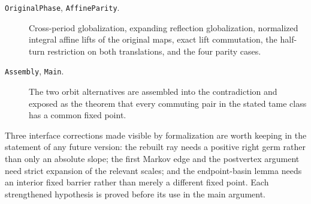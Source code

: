 \documentclass[11pt]{article}
\theoremstyle{definition}
\theoremstyle{remark}
\begin{document}
\begin{description}
\item[\texttt{OriginalPhase}, \texttt{AffineParity}.]
Cross-period globalization, expanding reflection globalization, normalized
integral affine lifts of the original maps, exact lift commutation, the
half-turn restriction on both translations, and the four parity cases.

\item[\texttt{Assembly}, \texttt{Main}.]
The two orbit alternatives are assembled into the contradiction and exposed
as the theorem that every commuting pair in the stated tame class has a
common fixed point.
\end{description}

Three interface corrections made visible by formalization are worth keeping
in the statement of any future version: the rebuilt ray needs a positive
right germ rather than only an absolute slope; the first Markov edge and the
postvertex argument need strict expansion of the relevant scales; and the
endpoint-basin lemma needs an interior fixed barrier rather than merely a
different fixed point.  Each strengthened hypothesis is proved before its
use in the main argument.
\end{document}
